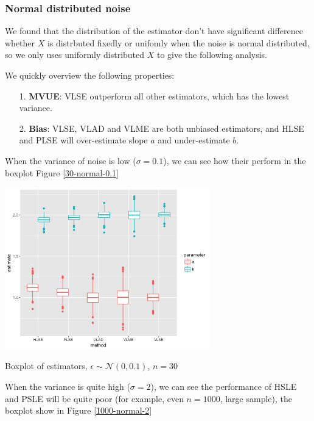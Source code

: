 \documentclass[twoside]{article}
\begin{document}
\subsubsection*{Normal distributed noise}

We found that the distribution of the estimator don't have significant difference whether $X$ is distrbuted fixedly or unifomly when the noise is normal distributed, so we only uses uniformly distributed $X$ to give the following analysis.

We quickly overview the following properties:

\begin{itemize}
  \item [1.] \textbf{MVUE}: VLSE outperform all other estimators, which has the lowest variance.
  \item [2.] \textbf{Bias}: VLSE, VLAD and VLME are both unbiased estimators, and HLSE and PLSE will over-estimate slope $a$ and under-estimate $b$.
\end{itemize}

When the variance of noise is low ($\sigma=0.1$), we can see how their perform in the boxplot Figure \ref{30-normal-0.1}

\begin{center}
\makeatletter
\def\@captype{figure}
\makeatother
\includegraphics [height=7cm]{code/n=30,uniform,normal_0.1.png}
\caption{Boxplot of estimators, $\epsilon \sim \mathcal{N}(0,0.1)$, $n=30$}
\label{30-normal-0.1}
\end{center}

When the variance is quite high ($\sigma=2$), we can see the performance of HSLE and PSLE will be quite poor (for example, even $n=1000$, large sample), the boxplot show in Figure \ref{1000-normal-2}
\end{document}
